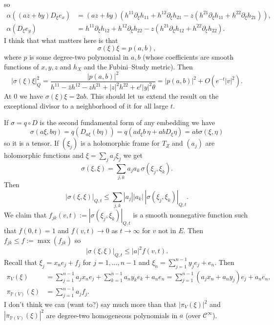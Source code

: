 \documentclass[10pt,a4paper]{amsart}
\newcommand{\kk}[1]{\mathbb{#1}}
\newcommand{\cc}[1]{\mathcal{#1}}
\begin{document}
so
\begin{align*}
\alpha((az+by) D_\xi e_x)
&= (az + by) (
h^{11} \partial_\xi h_{11} {+} h^{12} \partial_\xi h_{21}
- z  (h^{21} \partial_\xi h_{11} {+} h^{22} \partial_\xi h_{21} )
),
\\
\alpha(D_\xi e_y)
&=
h^{11} \partial_\xi h_{12} {+} h^{12} \partial_\xi h_{22}
- z (h^{21} \partial_\xi h_{12} {+} h^{22} \partial_\xi h_{22}).
\end{align*}
I think that what matters here is that
$$
\sigma(\xi)\xi
= p(a,b),
$$
where $p$ is some degree-two polynomial in $a,b$ (whose coefficients are smooth
functions of $x,y,z$ and $h_X$ and the Fubini--Study metric).
Then
$$
|\sigma(\xi)\xi|^2_Q
= \frac{|p(a,b)|^2}{h^{11} - \bar z h^{12} - z h^{21} + |z|^2 h^{22} + e^t |y|^2 \theta}
= |p(a,b)|^2 + O(e^{-t} |v|^2).
$$
At $0$ we have $\sigma(\xi)\xi = 2ab$.
This should let us extend the result on the exceptional divisor to a
neighborhood of it for all large $t$.



If $\sigma = q \circ D$ is the second fundamental form of any embedding we have
$$
\sigma(a \xi, b \eta)
= q(D_{a\xi}(b \eta))
= q(a d_\xi b \, \eta + ab D_\xi \eta)
= ab \sigma(\xi, \eta)
$$
so it is a tensor.
If $(\xi_j)$ is a holomorphic frame for $T_Z$ and $(a_j)$ are holomorphic
functions and $\xi = \sum_j a_j \xi_j$ we get
$$
\sigma(\xi, \xi)
= \sum_{j,k} a_j a_k \, \sigma(\xi_j, \xi_k).
$$
Then
$$
|\sigma(\xi, \xi)|_{Q,t}
\leq \sum_{j,k} |a_j||a_k| \, |\sigma(\xi_j, \xi_k)|_{Q,t}.
$$
We claim that $f_{jk}(v, t) := |\sigma(\xi_j, \xi_k)|_{Q,t}$ is a smooth
nonnegative function such that $f(0, t) = 1$ and $f(v, t) \to 0$ as $t \to
\infty$ for $v$ not in $E$.
Then $f_{jk} \leq f := \max(f_{jk})$ so
$$
|\sigma(\xi, \xi)|_{Q,t} \leq |a|^2 f(v,t) .
$$
Recall that $\xi_j = x_n e_j + f_j$ for $j = 1, \ldots, n-1$ and
$\xi_n = \sum_{j=1}^{n-1} y_j e_j + e_n$.
Then
\begin{align*}
\pi_V(\xi)
&= \sum_{j=1}^{n-1} a_j x_n e_j + \sum_{k=1}^{n-1} a_n y_k e_k + a_n e_n
= \sum_{j=1}^{n-1} (a_j x_n + a_n y_j) e_j + a_n e_n,
\\
\pi_{\kk P(V)}(\xi)
&= \sum_{j=1}^{n-1} a_j f_j.
\end{align*}
I don't think we can (want to?) say much more than that $|\pi_V(\xi)|^2$ and
$|\pi_{\kk P(V)}(\xi)|^2$ are degree-two homogeneous polynomials in $a$
(over $\cc C^\infty$).
\end{document}
